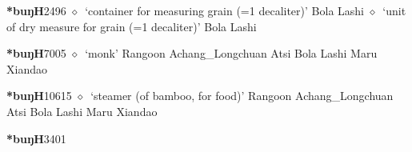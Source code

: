   \begin{list}{}{\leftmargin=1.5em \itemindent=-1.5em}
  \item {\footnotesize \textbf{*buŋH}}{\tiny 2496}
         $\diamond$~`container for measuring grain (=1 decaliter)'
         Bola 
\hspace{1ex}
         Lashi 
\hspace{1ex}
         $\diamond$~`unit of dry measure for grain (=1 decaliter)'
         Bola 
\hspace{1ex}
         Lashi 
  \item {\footnotesize \textbf{*buŋH}}{\tiny 7005}
\hspace{1ex}
         $\diamond$~`monk'
         Rangoon 
\hspace{1ex}
         Achang\_Longchuan 
\hspace{1ex}
         Atsi 
\hspace{1ex}
         Bola 
\hspace{1ex}
         Lashi 
\hspace{1ex}
         Maru 
\hspace{1ex}
         Xiandao 
  \item {\footnotesize \textbf{*buŋH}}{\tiny 10615}
\hspace{1ex}
         $\diamond$~`steamer (of bamboo, for food)'
         Rangoon 
\hspace{1ex}
         Achang\_Longchuan 
\hspace{1ex}
         Atsi 
\hspace{1ex}
         Bola 
\hspace{1ex}
         Lashi 
\hspace{1ex}
         Maru 
\hspace{1ex}
         Xiandao 
  \item {\footnotesize \textbf{*buŋH}}{\tiny 3401}

\end{list}
